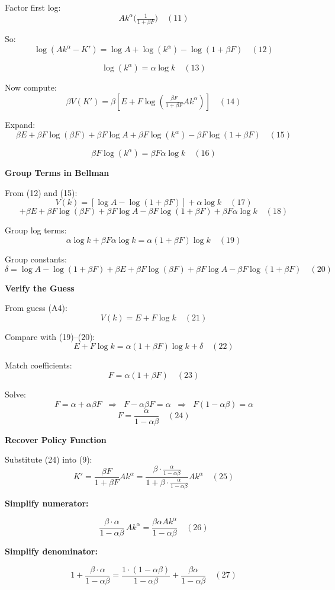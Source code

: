 \documentclass[12pt]{article}
\begin{document}
Factor first log:
\[
Ak^{\alpha}\Big(\tfrac{1}{1+\beta F}\Big) \quad (11)
\]

So:
\[
\log(Ak^{\alpha}-K')=\log A+\log(k^{\alpha})-\log(1+\beta F) \quad (12)
\]

\[
\log(k^{\alpha})=\alpha \log k \quad (13)
\]

Now compute:
\[
\beta V(K')=\beta[E+F\log(\tfrac{\beta F}{1+\beta F}Ak^{\alpha})] \quad (14)
\]

Expand:
\[
\beta E+\beta F\log(\beta F)+\beta F\log A+\beta F\log(k^{\alpha})-\beta F\log(1+\beta F) \quad (15)
\]

\[
\beta F\log(k^{\alpha})=\beta F\alpha \log k \quad (16)
\]

\textbf{Group Terms in Bellman}

From (12) and (15):
\[
V(k)=[\log A-\log(1+\beta F)]+\alpha \log k \quad (17)
\]
\[
+\beta E+\beta F\log(\beta F)+\beta F\log A-\beta F\log(1+\beta F)+\beta F\alpha \log k \quad (18)
\]

Group log terms:
\[
\alpha \log k+\beta F \alpha \log k=\alpha(1+\beta F)\log k \quad (19)
\]

Group constants:
\[
\delta=\log A-\log(1+\beta F)+\beta E+\beta F\log(\beta F)+\beta F\log A-\beta F\log(1+\beta F) \quad (20)
\]

\textbf{Verify the Guess}

From guess (A4):
\[
V(k)=E+F\log k \quad (21)
\]

Compare with (19)–(20):
\[
E+F\log k=\alpha(1+\beta F)\log k+\delta \quad (22)
\]

Match coefficients:
\[
F=\alpha(1+\beta F) \quad (23)
\]

Solve:
\[
F=\alpha+\alpha\beta F \;\;\Rightarrow\;\; F-\alpha\beta F=\alpha \;\;\Rightarrow\;\; F(1-\alpha\beta)=\alpha
\]
\[
F=\frac{\alpha}{1-\alpha\beta} \quad (24)
\]

\textbf{Recover Policy Function}

Substitute (24) into (9):
\[
K'=\frac{\beta F}{1+\beta F}Ak^{\alpha}=\frac{\beta \cdot \tfrac{\alpha}{1-\alpha\beta}}{1+\beta \cdot \tfrac{\alpha}{1-\alpha\beta}}Ak^{\alpha} \quad (25)
\]

\textbf{Simplify numerator:}

\[
\frac{\beta \cdot \alpha}{1-\alpha\beta}\, A k^{\alpha}
= \frac{\beta \alpha A k^{\alpha}}{1-\alpha\beta} 
\quad (26)
\]

\textbf{Simplify denominator:}

\[
1+\frac{\beta \cdot \alpha}{1-\alpha\beta}
= \frac{1\cdot(1-\alpha\beta)}{1-\alpha\beta}+\frac{\beta \alpha}{1-\alpha\beta}
\quad (27)
\]
\end{document}
